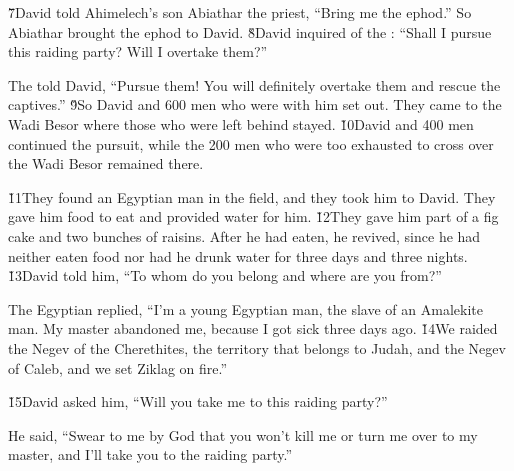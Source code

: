 \v{7}David told Ahimelech's son Abiathar the priest, ``Bring me the ephod.'' So Abiathar brought the ephod to David. \v{8}David inquired of the : ``Shall I pursue this raiding party? Will I overtake them?''

The  told David, ``Pursue them! You will definitely overtake them and rescue the captives.'' \v{9}So David and 600 men who were with him set out. They came to the Wadi Besor where those who were left behind stayed. \v{10}David and 400 men continued the pursuit, while the 200 men who were too exhausted to cross over the Wadi Besor remained there.

\v{11}They found an Egyptian man in the field, and they took him to David. They gave him food to eat and provided water for him. \v{12}They gave him part of a fig cake and two bunches of raisins. After he had eaten, he revived, since he had neither eaten food nor had he drunk water for three days and three nights. \v{13}David told him, ``To whom do you belong and where are you from?''

The Egyptian replied, ``I'm a young Egyptian man, the slave of an Amalekite man. My master abandoned me, because I got sick three days ago. \v{14}We raided the Negev of the Cherethites, the territory that belongs to Judah, and the Negev of Caleb, and we set Ziklag on fire.''

\v{15}David asked him, ``Will you take me to this raiding party?''

He said, ``Swear to me by God that you won't kill me or turn me over to my master, and I'll take you to the raiding party.''

